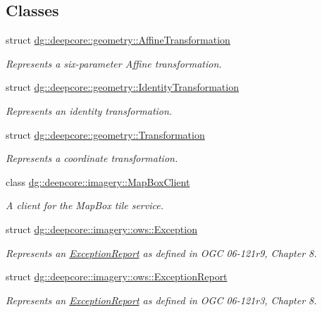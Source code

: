 \subsection*{Classes}
\begin{DoxyCompactItemize}
\item 
struct \hyperlink{structdg_1_1deepcore_1_1geometry_1_1_affine_transformation}{dg\+::deepcore\+::geometry\+::\+Affine\+Transformation}
\begin{DoxyCompactList}\small\item\em Represents a six-\/parameter Affine transformation. \end{DoxyCompactList}\item 
struct \hyperlink{structdg_1_1deepcore_1_1geometry_1_1_identity_transformation}{dg\+::deepcore\+::geometry\+::\+Identity\+Transformation}
\begin{DoxyCompactList}\small\item\em Represents an identity transformation. \end{DoxyCompactList}\item 
struct \hyperlink{structdg_1_1deepcore_1_1geometry_1_1_transformation}{dg\+::deepcore\+::geometry\+::\+Transformation}
\begin{DoxyCompactList}\small\item\em Represents a coordinate transformation. \end{DoxyCompactList}\item 
class \hyperlink{classdg_1_1deepcore_1_1imagery_1_1_map_box_client}{dg\+::deepcore\+::imagery\+::\+Map\+Box\+Client}
\begin{DoxyCompactList}\small\item\em A client for the Map\+Box tile service. \end{DoxyCompactList}\item 
struct \hyperlink{structdg_1_1deepcore_1_1imagery_1_1ows_1_1_exception}{dg\+::deepcore\+::imagery\+::ows\+::\+Exception}
\begin{DoxyCompactList}\small\item\em Represents an \hyperlink{structdg_1_1deepcore_1_1imagery_1_1ows_1_1_exception_report}{Exception\+Report} as defined in O\+GC 06-\/121r9, Chapter 8. \end{DoxyCompactList}\item 
struct \hyperlink{structdg_1_1deepcore_1_1imagery_1_1ows_1_1_exception_report}{dg\+::deepcore\+::imagery\+::ows\+::\+Exception\+Report}
\begin{DoxyCompactList}\small\item\em Represents an \hyperlink{structdg_1_1deepcore_1_1imagery_1_1ows_1_1_exception_report}{Exception\+Report} as defined in O\+GC 06-\/121r3, Chapter 8. \end{DoxyCompactList}\item 

\end{DoxyCompactItemize}
